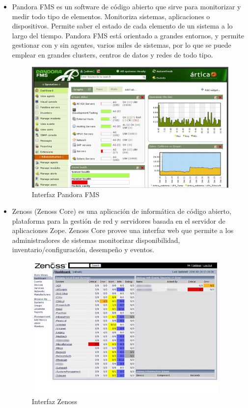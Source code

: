 \documentclass[11pt,a4paper]{article}
\begin{document}
\begin{itemize}

\item Pandora FMS\cite{web-PandoraFMS} es un software de código abierto que sirve para monitorizar y medir todo tipo de elementos. Monitoriza sistemas, aplicaciones o dispositivos. Permite saber el estado de cada elemento de un sistema a lo largo del tiempo. Pandora FMS está orientado a grandes entornos, y permite gestionar con y sin agentes, varios miles de sistemas, por lo que se puede emplear en grandes clusters, centros de datos y redes de todo tipo.

\begin{figure}[hbtp]
\centerline{\includegraphics[width=10 cm]{images/pandoraFMS.png}}
\caption{Interfaz Pandora FMS}
\label{PandoraFMS}
\end{figure}


\item Zenoss (Zenoss Core)\cite{web-Zenoss} es una aplicación de informática de código abierto, plataforma para la gestión de red y servidores basada en el servidor de aplicaciones Zope. Zenoss Core provee una interfaz web que permite a los administradores de sistemas monitorizar disponibilidad, inventario/configuración, desempeño y eventos.

\begin{figure}[hbtp]
\centerline{\includegraphics[width=10cm]{images/Zenossscreen.jpg}}
\caption{Interfaz Zenoss}
\label{Zenoss}
\end{figure}

\end{itemize}
    
\end{document}
